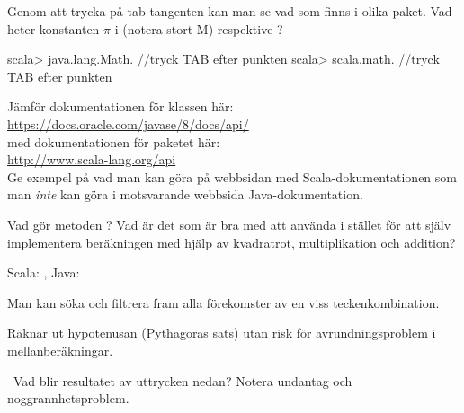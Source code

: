 \Task \what


\Subtask Genom att trycka på tab tangenten kan man se vad som finns i olika paket. Vad heter konstanten $\pi$  i  (notera stort M) respektive ?

\begin{REPL}
scala> java.lang.Math.    //tryck TAB efter punkten
scala> scala.math.        //tryck TAB efter punkten
\end{REPL}

\Subtask Jämför dokumentationen för klassen  här: \\ \url{https://docs.oracle.com/javase/8/docs/api/} \\
med dokumentationen för paketet  här: \\
\url{http://www.scala-lang.org/api} \\
Ge exempel på vad man kan göra på webbsidan med Scala-dokumentationen som man \emph{inte} kan göra i motsvarande webbsida Java-dokumentation.

\Subtask Vad gör metoden ? Vad är det som är bra med att använda  i stället för att själv implementera beräkningen med hjälp av kvadratrot, multiplikation och addition?

\SOLUTION

\TaskSolved \what

\SubtaskSolved Scala: , Java: 

\SubtaskSolved Man kan söka och filtrera fram alla förekomster av en viss teckenkombination.

\SubtaskSolved Räknar ut hypotenusan (Pythagoras sats) utan risk för avrundningsproblem i mellanberäkningar.


\QUESTEND






\QUESTBEGIN

\Task \what~Vad blir resultatet av uttrycken nedan? Notera undantag  och noggrannhetsproblem.

\Subtask {}

\Subtask {}

\Subtask {}

\Subtask {}

\Subtask {}

